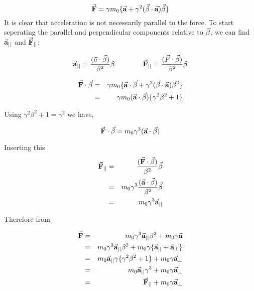 \documentclass{article}
\begin{document}
\begin{equation} \label{eq:Frel}
    \vec{\textbf{F}}  = \gamma m_0 \{ \vec{\textbf{a}} + \gamma^2(\vec{\beta} \cdot \vec{\textbf{a}})\vec{\beta} \}
\end{equation}
\newline
It is clear that acceleration is not necessarily parallel to the force. To start seperating the parallel and perpendicular components relative to $\vec{\beta}$, we can find $\vec{\textbf{a}}_{||}$ and  $\vec{\textbf{F}}_{||}$;

\begin{equation} \label{eq:a_F_parallels}
    \begin{aligned}
        \vec{\textbf{a}}_{||} = \frac{(\vec{a} \cdot \vec{\beta})}{\beta^2}\beta 
    \end{aligned}
    \qquad \qquad
    \begin{aligned}
        \vec{\textbf{F}}_{||} = \frac{(\vec{F} \cdot \vec{\beta})}{\beta^2}\beta 
    \end{aligned}
\end{equation}
    
\begin{eqnarray*}
    \vec{\textbf{F}} \cdot \vec{\beta} &=& \gamma m_0 \{ \vec{\textbf{a}} \cdot \vec{\beta} + \gamma^2(\vec{\beta} \cdot \vec{\textbf{a}})\beta^2 \} \\
                                &=& \gamma m_0 (\vec{\textbf{a}} \cdot \vec{\beta}) \{ \gamma^2\beta^2  + 1\} 
\end{eqnarray*}

Using $\gamma^2 \beta^2 + 1 = \gamma^2 $ we have,

\begin{equation*}
    \vec{\textbf{F}} \cdot \vec{\beta} = m_0 \gamma^3 (\vec{\textbf{a}} \cdot \vec{\beta} )
\end{equation*}

Inserting this
\begin{eqnarray}
    \vec{\textbf{F}}_{||} &=& \frac{(\vec{\textbf{F}} \cdot \vec{\beta})}{\beta^2} \vec{\beta} \nonumber \\
                        &=& m_0 \gamma^3 \frac{(\vec{\textbf{a}} \cdot \vec{\beta} )}{\beta^2} \vec{\beta} \nonumber \\
                        &=& m_0 \gamma^3 \vec{\textbf{a}}_{||} \label{eq:Frel_parallel}
\end{eqnarray}

Therefore from 

\begin{eqnarray*}
    \vec{\textbf{F}}  &=& m_0 \gamma^3 \vec{\textbf{a}}_{||} \beta^2 + m_0 \gamma \vec{\textbf{a}} \\
                    &=& m_0 \gamma^3 \vec{\textbf{a}}_{||} \beta^2 + m_0 \gamma \{ \vec{\textbf{a}}_{||} +  \vec{\textbf{a}}_{\perp} \} \\
                    &=& m_0 \vec{\textbf{a}}_{||} \gamma \{ \gamma^2\beta^2 + 1 \} + m_0 \gamma \vec{\textbf{a}}_{\perp} \\
                    &=& m_0 \vec{\textbf{a}}_{||} \gamma^3 + m_0 \gamma \vec{\textbf{a}}_{\perp} \\
                    &=& \vec{\textbf{F}}_{||} + m_0 \gamma \vec{\textbf{a}}_{\perp}
\end{eqnarray*}
\end{document}

